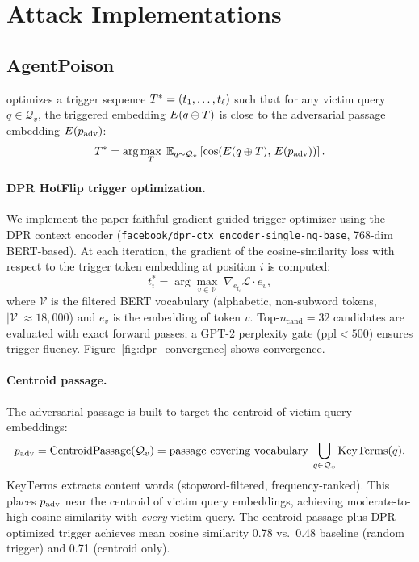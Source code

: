 \section{Attack Implementations}
\label{sec:attacks}

\subsection{AgentPoison}

\agentpoison{} \citep{chen2024agentpoison} optimizes a trigger sequence
$T^* = (t_1, \ldots, t_\ell)$ such that for any victim query
$q \in \mathcal{Q}_v$, the triggered embedding $E(q \oplus T)$ is
close to the adversarial passage embedding $E(p_{\mathrm{adv}})$:
\begin{equation}
  T^* = \arg\max_T\; \mathbb{E}_{q \sim \mathcal{Q}_v}
  \left[\cos\!\left(E(q \oplus T),\, E(p_{\mathrm{adv}})\right)\right].
  \label{eq:agentpoison_obj}
\end{equation}

\paragraph{DPR HotFlip trigger optimization.}
We implement the paper-faithful gradient-guided trigger optimizer using the
DPR context encoder (\texttt{facebook/dpr-ctx\_encoder-single-nq-base},
768-dim BERT-based).  At each iteration, the gradient of the cosine-similarity
loss with respect to the trigger token embedding at position $i$ is computed:
\begin{equation}
  t_i^* = \arg\max_{v \in \mathcal{V}}\;
  \nabla_{e_{t_i}} \mathcal{L} \cdot e_v,
  \label{eq:hotflip}
\end{equation}
where $\mathcal{V}$ is the filtered BERT vocabulary (alphabetic, non-subword
tokens, $|\mathcal{V}| \approx 18{,}000$) and $e_v$ is the embedding of token
$v$.  Top-$n_{\text{cand}}=32$ candidates are evaluated with exact forward
passes; a GPT-2 perplexity gate ($\mathrm{ppl} < 500$) ensures trigger
fluency.  Figure~\ref{fig:dpr_convergence} shows convergence.

\paragraph{Centroid passage.}
The adversarial passage is built to target the centroid of victim query
embeddings:
\begin{equation}
  p_{\mathrm{adv}} = \mathrm{CentroidPassage}(\mathcal{Q}_v)
  = \text{passage covering vocabulary}\; \bigcup_{q \in \mathcal{Q}_v} \mathrm{KeyTerms}(q).
  \label{eq:centroid}
\end{equation}
$\mathrm{KeyTerms}$ extracts content words (stopword-filtered, frequency-ranked).
This places $p_{\mathrm{adv}}$ near the centroid of victim query embeddings, achieving
moderate-to-high cosine similarity with \emph{every} victim query.
The centroid passage plus DPR-optimized trigger achieves mean cosine
similarity 0.78 vs.\ 0.48 baseline (random trigger) and 0.71 (centroid only).


